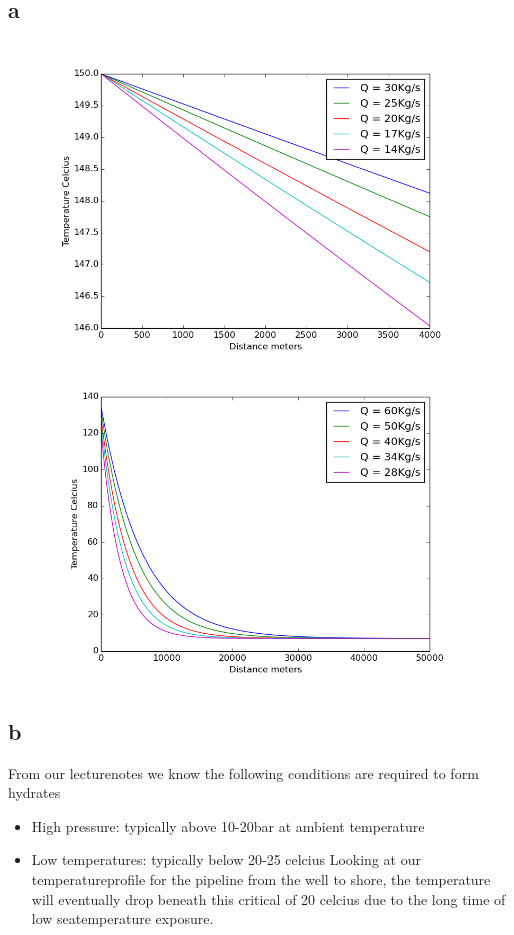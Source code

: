 \documentclass[a4paper,norsk]{article}
\begin{document}
\subsection*{a}
\begin{figure}[h!]  
  \centering
  \includegraphics[scale=0.4]{wellhead.png}
  \includegraphics[scale=0.4]{shore.png}
\end{figure}
\newpage

\subsection*{b}
From our lecturenotes we know the following conditions are required to form hydrates
\begin{itemize}
\item High pressure: typically above 10-20bar at ambient temperature
\item Low temperatures: typically below 20-25 celcius
Looking at our temperatureprofile for the pipeline from the well to shore, the temperature will eventually drop beneath this critical of 20 celcius due to the long time of low seatemperature exposure. 
\end{itemize}
\end{document}
